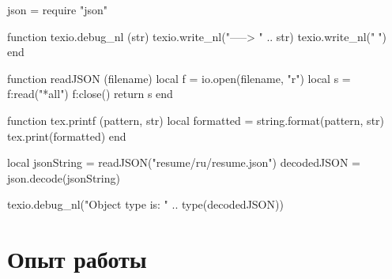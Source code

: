 \documentclass{article}
\begin{document}
\begin{luacode}
json = require "json"

function texio.debug_nl (str)
    texio.write_nl("-----> " .. str)
    texio.write_nl("^^^")
end

function readJSON (filename)
    local f = io.open(filename, "r")
    local s = f:read("*all")
    f:close()
    return s
end

function tex.printf (pattern, str)
    local formatted = string.format(pattern, str)
    tex.print(formatted)
end

local jsonString = readJSON("resume/ru/resume.json")
decodedJSON = json.decode(jsonString)

texio.debug_nl("Object type is: " .. type(decodedJSON))
\end{luacode}


\maketitle

\section{Опыт работы}




\begin{luacode}
\end{luacode}
\end{document}
